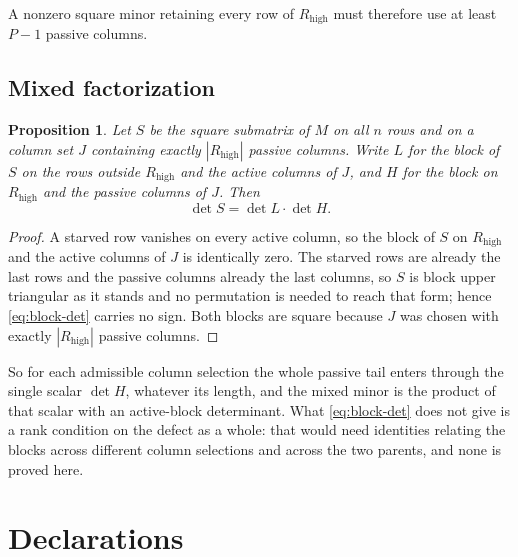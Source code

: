 \documentclass[11pt,a4paper]{amsart}
\numberwithin{equation}{section}
\theoremstyle{plain}
\newtheorem{proposition}[theorem]{Proposition}
\theoremstyle{definition}
\begin{document}
A nonzero square minor retaining every row of \(R_{\mathrm{high}}\) must therefore use at least \(P-1\) passive columns.

\subsection{Mixed factorization}

\begin{proposition}\label{prop:block-factorization}
Let \(S\) be the square submatrix of \(M\) on all \(n\) rows and on a column set \(J\) containing exactly \(|R_{\mathrm{high}}|\) passive columns.  Write \(L\) for the block of \(S\) on the rows outside \(R_{\mathrm{high}}\) and the active columns of \(J\), and \(H\) for the block on \(R_{\mathrm{high}}\) and the passive columns of \(J\).  Then
\begin{equation}\label{eq:block-det}
\det S=\det L\cdot\det H.
\end{equation}
\end{proposition}

\begin{proof}
A starved row vanishes on every active column, so the block of \(S\) on \(R_{\mathrm{high}}\) and the active columns of \(J\) is identically zero.  The starved rows are already the last rows and the passive columns already the last columns, so \(S\) is block upper triangular as it stands and no permutation is needed to reach that form; hence \eqref{eq:block-det} carries no sign.  Both blocks are square because \(J\) was chosen with exactly \(|R_{\mathrm{high}}|\) passive columns.
\end{proof}

So for each admissible column selection the whole passive tail enters through the single scalar \(\det H\), whatever its length, and the mixed minor is the product of that scalar with an active-block determinant.  What \eqref{eq:block-det} does not give is a rank condition on the defect as a whole: that would need identities relating the blocks across different column selections and across the two parents, and none is proved here.

\section*{Declarations}
\end{document}
